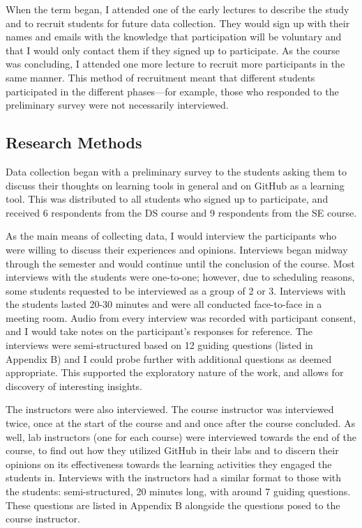 When the term began, I attended one of the early lectures to describe the study and to recruit students for future data collection. They would sign up with their names and emails with the knowledge that participation will be voluntary and that I would only contact them if they signed up to participate. As the course was concluding, I attended one more lecture to recruit more participants in the same manner. This method of recruitment meant that different students participated in the different phases---for example, those who responded to the preliminary survey were not necessarily interviewed.

\subsection{Research Methods}
Data collection began with a preliminary survey to the students asking them to discuss their thoughts on learning tools in general and on GitHub as a learning tool. This was distributed to all students who signed up to participate, and received 6 respondents from the DS course and 9 respondents from the SE course.

As the main means of collecting data, I would interview the participants who were willing to discuss their experiences and opinions. Interviews began midway through the semester and would continue until the conclusion of the course. Most interviews with the students were one-to-one; however, due to scheduling reasons, some students requested to be interviewed as a group of 2 or 3. Interviews with the students lasted 20-30 minutes and were all conducted face-to-face in a meeting room. Audio from every interview was recorded with participant consent, and I would take notes on the participant's responses for reference. The interviews were semi-structured based on 12 guiding questions (listed in Appendix B) and I could probe further with additional questions as deemed appropriate. This supported the exploratory nature of the work, and allows for discovery of interesting insights.

The instructors were also interviewed. The course instructor was interviewed twice, once at the start of the course and and once after the course concluded. As well, lab instructors (one for each course) were interviewed towards the end of the course, to find out how they utilized GitHub in their labs and to discern their opinions on its effectiveness towards the learning activities they engaged the students in. Interviews with the instructors had a similar format to those with the students: semi-structured, 20 minutes long, with around 7 guiding questions. These questions are listed in Appendix B alongside the questions posed to the course instructor.

